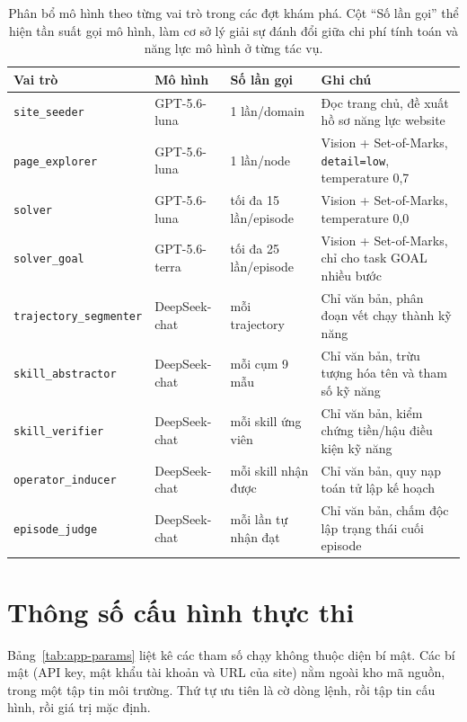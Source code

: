 \begin{table}[H]
\centering
\caption[Phân bổ mô hình theo vai trò]{Phân bổ mô hình theo từng vai trò trong các đợt khám phá. Cột ``Số lần gọi'' thể hiện tần suất gọi mô hình, làm cơ sở lý giải sự đánh đổi giữa chi phí tính toán và năng lực mô hình ở từng tác vụ.}
\label{tab:app-roles}
\footnotesize
\begin{tabular}{@{}L{3.6cm}L{2.8cm}L{2.8cm}L{4.2cm}@{}}
\toprule
\textbf{Vai trò} & \textbf{Mô hình} & \textbf{Số lần gọi} & \textbf{Ghi chú} \\
\midrule
\texttt{site\_seeder} & GPT-5.6-luna & 1 lần/domain & Đọc trang chủ, đề xuất hồ sơ năng lực website \\
\texttt{page\_explorer} & GPT-5.6-luna & 1 lần/node & Vision + Set-of-Marks, \texttt{detail=low}, temperature 0,7 \\
\texttt{solver} & GPT-5.6-luna & tối đa 15 lần/episode & Vision + Set-of-Marks, temperature 0,0 \\
\texttt{solver\_goal} & GPT-5.6-terra & tối đa 25 lần/episode & Vision + Set-of-Marks, chỉ cho task GOAL nhiều bước \\
\texttt{trajectory\_segmenter} & DeepSeek-chat & mỗi trajectory & Chỉ văn bản, phân đoạn vết chạy thành kỹ năng \\
\texttt{skill\_abstractor} & DeepSeek-chat & mỗi cụm 9 mẫu & Chỉ văn bản, trừu tượng hóa tên và tham số kỹ năng \\
\texttt{skill\_verifier} & DeepSeek-chat & mỗi skill ứng viên & Chỉ văn bản, kiểm chứng tiền/hậu điều kiện kỹ năng \\
\texttt{operator\_inducer} & DeepSeek-chat & mỗi skill nhận được & Chỉ văn bản, quy nạp toán tử lập kế hoạch \\
\texttt{episode\_judge} & DeepSeek-chat & mỗi lần tự nhận đạt & Chỉ văn bản, chấm độc lập trạng thái cuối episode \\
\bottomrule
\end{tabular}
\end{table}

\section{Thông số cấu hình thực thi}
\label{app:design-params}

Bảng~\ref{tab:app-params} liệt kê các tham số chạy không thuộc diện bí mật.
Các bí mật (API key, mật khẩu tài khoản và URL của site) nằm ngoài kho
mã nguồn, trong một tập tin môi trường. Thứ tự ưu tiên là cờ dòng lệnh, rồi
tập tin cấu hình, rồi giá trị mặc định.

